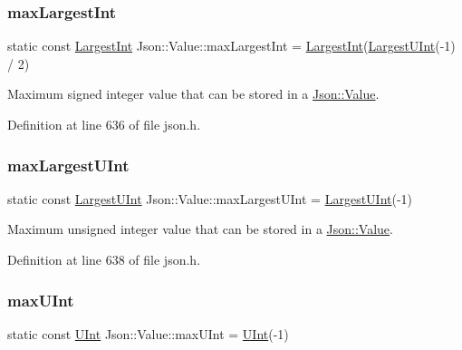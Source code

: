 \subsubsection{\texorpdfstring{max\+Largest\+Int}{maxLargestInt}}
{\footnotesize\ttfamily static const \hyperlink{class_json_1_1_value_a1cbb82642ed05109b9833e49f042ece7}{Largest\+Int} Json\+::\+Value\+::max\+Largest\+Int = \hyperlink{class_json_1_1_value_a1cbb82642ed05109b9833e49f042ece7}{Largest\+Int}(\hyperlink{class_json_1_1_value_a6682a3684d635e03fc06ba229fa24eec}{Largest\+U\+Int}(-\/1) / 2)\hspace{0.3cm}{\ttfamily [static]}}



Maximum signed integer value that can be stored in a \hyperlink{class_json_1_1_value}{Json\+::\+Value}. 



Definition at line 636 of file json.\+h.

\hypertarget{class_json_1_1_value_a2337d4fee6277c9f9b8feb21e6cd9f1c}{}\label{class_json_1_1_value_a2337d4fee6277c9f9b8feb21e6cd9f1c} 
\subsubsection{\texorpdfstring{max\+Largest\+U\+Int}{maxLargestUInt}}
{\footnotesize\ttfamily static const \hyperlink{class_json_1_1_value_a6682a3684d635e03fc06ba229fa24eec}{Largest\+U\+Int} Json\+::\+Value\+::max\+Largest\+U\+Int = \hyperlink{class_json_1_1_value_a6682a3684d635e03fc06ba229fa24eec}{Largest\+U\+Int}(-\/1)\hspace{0.3cm}{\ttfamily [static]}}



Maximum unsigned integer value that can be stored in a \hyperlink{class_json_1_1_value}{Json\+::\+Value}. 



Definition at line 638 of file json.\+h.

\hypertarget{class_json_1_1_value_a905f07575ee561e5b0f0a57e8ea31462}{}\label{class_json_1_1_value_a905f07575ee561e5b0f0a57e8ea31462} 
\subsubsection{\texorpdfstring{max\+U\+Int}{maxUInt}}
{\footnotesize\ttfamily static const \hyperlink{class_json_1_1_value_a0933d59b45793ae4aade1757c322a98d}{U\+Int} Json\+::\+Value\+::max\+U\+Int = \hyperlink{class_json_1_1_value_a0933d59b45793ae4aade1757c322a98d}{U\+Int}(-\/1)\hspace{0.3cm}{\ttfamily [static]}}



